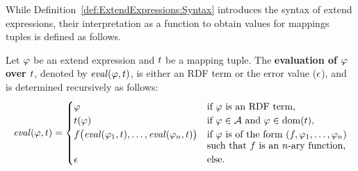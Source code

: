 While Definition~\ref{def:ExtendExpressions:Syntax} introduces the syntax of extend expressions, their interpretation as a function to obtain values for mappings tuples is defined as follows.

\begin{definition}
	\label{def:ExtendExpressions:Semantics}
	\normalfont
	Let $\varphi$ be an extend expression and $t$ be a mapping tuple.
	The \textbf{evaluation of $\varphi$ over $t$}, denoted by $\mathit{eval}(\varphi,t)$, is either an RDF term or the error value ($\epsilon$), and is determined recursively as follows:%
%
%
\vspace{-2mm} %
%
	\begin{equation*}
		\mathit{eval}(\varphi,t) =
		\begin{cases}
			\varphi
			& \text{if $\varphi$ is an RDF term,}
			\\
			t(\varphi)
			& \text{if $\varphi \in \mathcal{A}$ and $\varphi \in \mathrm{dom}(t)$,}
			\\
			f\bigl(\mathit{eval}(\varphi_1,t),\dots,\mathit{eval}(\varphi_n,t)\bigr)
			& \text{if $\varphi$ is of the form $(f,\varphi_1,\dots,\varphi_n)$} \\[-1mm]
			& \text{such that $f$ is an $n$-ary function,} \\
			\epsilon
			& \text{else.}
		\end{cases}
	\end{equation*}
\end{definition}

